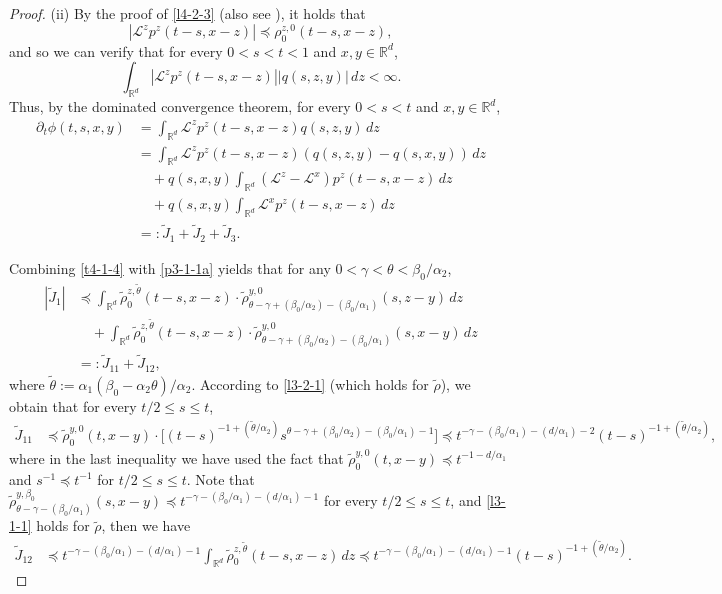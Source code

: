 \documentclass[a4paper,11pt]{amsart}
\renewcommand{\le}{\leqslant}
\newcommand{\R}{\mathds R}
\newcommand{\B}{\beta}
\newcommand{\T}{\theta}
\newcommand{\p}{\preceq}
\newcommand{\A}{\alpha}
\newcommand{\G}{\gamma}
\def\LL{{\mathcal L}}
\theoremstyle{definition}
\begin{document}
\begin{proof}
{(ii)} By the proof of \eqref{l4-2-3} (also see \cite[Theorem 2.4]{CZ}), it holds that
\begin{equation}\label{t4-1-4}
| \LL^zp^z(t-s,x-z)|\p \rho^{z,0}_0(t-s,x-z),
\end{equation} and so we can verify that for every $0<s<t<1$ and $x,y\in \R^d$,
$$\int_{\R^d}| \LL^z p^z(t-s,x-z)||q(s,z,y)|\,dz<\infty.$$
Thus, by the dominated convergence theorem, for every $0<s<t$ and $x,y \in \R^d$,
\begin{equation}\label{e:lkk}
\begin{split}
\partial_t \phi(t,s,x,y)&=\int_{\R^d} \LL^zp^z(t-s,x-z)q(s,z,y)\,dz\\
&=\int_{\R^d} \LL^zp^z(t-s,x-z)(q(s,z,y)-q(s,x,y))\,dz\\
&\quad +q(s,x,y)\int_{\R^d}( \LL^z- \LL^x)p^z(t-s,x-z)\,dz\\
&\quad +q(s,x,y)\int_{\R^d} \LL^x p^z(t-s,x-z)\,dz\\
&=:\tilde J_1+ \tilde J_2+ \tilde J_3.
\end{split}
\end{equation}

Combining \eqref{t4-1-4} with \eqref{p3-1-1a} yields that for any $0<\G<\T<{\B_0}/{\A_2}$,
\begin{align*}
|\tilde J_1| &\p \int_{\R^d}\tilde \rho^{z,\tilde \T}_0(t-s,x-z)\cdot
\tilde \rho^{y,0}_{\T-\G+({\B_0}/{\A_2})-({\B_0}/{\A_1})}(s,z-y)\,dz\\
&\quad +\int_{\R^d}\tilde \rho^{z,\tilde \T}_0(t-s,x-z)\cdot
\tilde \rho^{y,0}_{\T-\G+({\B_0}/{\A_2})-({\B_0}/{\A_1})}(s,x-y)\,dz\\
&=:\tilde J_{11}+ \tilde J_{12},
\end{align*}
where $\tilde \T:=\A_1(\B_0-\A_2\theta)/{\A_2}$.
According to \eqref{l3-2-1} (which holds for $\tilde \rho$), we obtain that
for every ${t}/{2}\le s \le t$,
\begin{align*}
\tilde J_{11}&\p \tilde \rho^{y,0}_0(t,x-y)\cdot\big[(t-s)^{-1+({\tilde \T}/{\A_2})}s^{\T-\G+(\B_0/\A_2)-({\B_0}/{\A_1})-1}\big]\p t^{-\G-({\B_0}/{\A_1})-({d}/{\A_1})-2}(t-s)^{-1+({\tilde \T}/{\A_2})},
\end{align*}
where in the last inequality we have used the fact that $\tilde\rho^{y,0}_0(t,x-y)\p t^{-1-d/\A_1}$ and
$s^{-1}\p t^{-1}$ for ${t}/{2}\le s \le t$. Note that $\tilde \rho^{y,\B_0}_{\T-\G-({\B_0}/{\A_1})}(s,x-y)\p t^{-\G-({\B_0}/{\A_1})-({d}/{\A_1})-1}$ for
every ${t}/{2}\le s \le t$,
and \eqref{l3-1-1} holds for $\tilde \rho$, then we have
\begin{align*}
\tilde J_{12}& \p t^{-\G-({\B_0}/{\A_1})-({d}/{\A_1})-1}\int_{\R^d}\tilde \rho^{z,\tilde \T}_{0}(t-s,x-z)\,dz\p t^{-\G-({\B_0}/{\A_1})-({d}/{\A_1})-1}(t-s)^{-1+({\tilde \T}/{\A_2})}.
\end{align*}


\end{proof}
\end{document}
